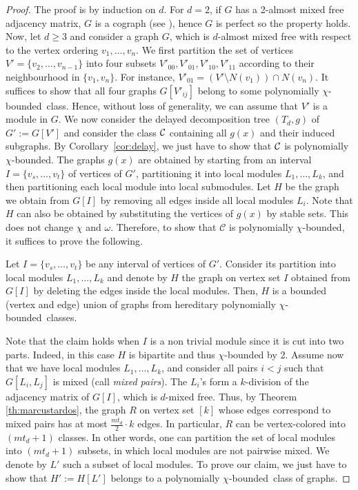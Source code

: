 \documentclass[11pt]{article}
\numberwithin{equation}{section}
\newcommand{\pcb}{polynomially $\chi$-bounded}
\begin{document}
\begin{proof}
The proof is by induction on $d$. For $d=2$, if $G$ has a 2-almost mixed free adjacency matrix, $G$ is a cograph (see \cite{PS22}), hence $G$ is perfect so the property holds. Now, let $d \geq 3$ and consider a graph $G$, which is $d$-almost mixed free with respect to the vertex ordering $v_1,\ldots ,v_n$. We first partition the set of vertices $V' =\{v_2,\dots, v_{n-1}\}$ into four subsets $V'_{00},V'_{01},V'_{10},V'_{11}$ according to their neighbourhood in $\{v_1,v_n\}$. For instance, $V'_{01}=(V'\setminus N(v_1))\cap N(v_n)$. It suffices to show that all four graphs $G[V'_{ij}]$ belong to some \pcb~class. Hence, without loss of generality, we can assume that $V'$ is a module in $G$. 
    We now consider the delayed decomposition tree $(T_d,g)$ of $G':=G[V']$ and consider the class $\cal C$ containing all $g(x)$ and their induced subgraphs. By Corollary~\ref{cor:delay}, we just have to show that $\cal C$ is \pcb. The graphs $g(x)$ are obtained by starting from an interval $I=\{v_s,\dots, v_t\}$ of vertices of $G'$, partitioning it into local modules $L_1,\dots, L_k$, and then partitioning each local module into local submodules. Let $H$ be the graph we obtain from $G[I]$ by removing all edges inside all local modules $L_i$. Note that $H$ can also be obtained by substituting the vertices of $g(x)$ by stable sets. This does not change $\chi$ and $\omega$. Therefore, to show that $\mathcal{C}$ is \pcb, it suffices to prove the following.

\begin{claim} Let $I=\{v_s,\dots, v_t\}$ be any interval of vertices of $G'$. Consider its partition into local modules $L_1,\dots, L_k$ and denote by $H$ the graph on vertex set $I$ obtained from $G[I]$ by deleting the edges inside the local modules. Then, $H$ is a bounded (vertex and edge) union of graphs from hereditary \pcb~classes.
\end{claim}

Note that the claim holds when $I$ is a non trivial module since it is cut into two parts. Indeed, in this case $H$ is bipartite and thus $\chi$-bounded by 2. Assume now that we have local modules $L_1,\dots ,L_k$, and consider all pairs $i<j$ such that $G[L_i,L_j]$ is mixed (call \emph{mixed pairs}). The $L_i$'s form a $k$-division of the adjacency matrix of $G[I]$, which is $d$-mixed free. Thus, by Theorem \ref{th:marcustardos}, the graph $R$ on vertex set $[k]$ whose edges correspond to mixed pairs has at most $\frac{mt_d}{2} \cdot k$ edges. In particular, $R$ can be vertex-colored into $(mt_d+1)$ classes. In other words, one can partition the set of local modules into $(mt_d+1)$ subsets, in which local modules are not pairwise mixed. We denote by $L'$ such a subset of local modules. To prove our claim, we just have to show that $H':=H[L']$ belongs to a \pcb~class of graphs.


\end{proof}
\end{document}
